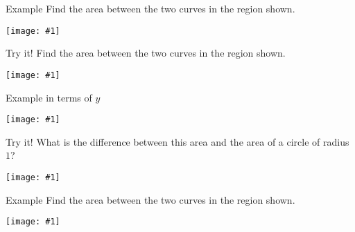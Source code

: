 \documentclass[t]{beamer}
\newcommand{\img}[1]{
\vfill
\begin{center}
\texttt{[image: \#1]}
\end{center}
\vfill
}
\begin{document}
\begin{frame}{Example}
Find the area between the two curves in the region shown.
\img{curves4}
\end{frame}

\begin{frame}{Try it!}
Find the area between the two curves in the region shown.
\img{curves5}
\end{frame}

\begin{frame}{Example in terms of $y$}
\img{curves6}
\end{frame}

\begin{frame}{Try it!}
What is the difference between this area and the area of a circle of radius $1$?
\img{curves7}
\end{frame}

\begin{frame}{Example}
Find the area between the two curves in the region shown.
\img{curves8}
\end{frame}
\end{document}

